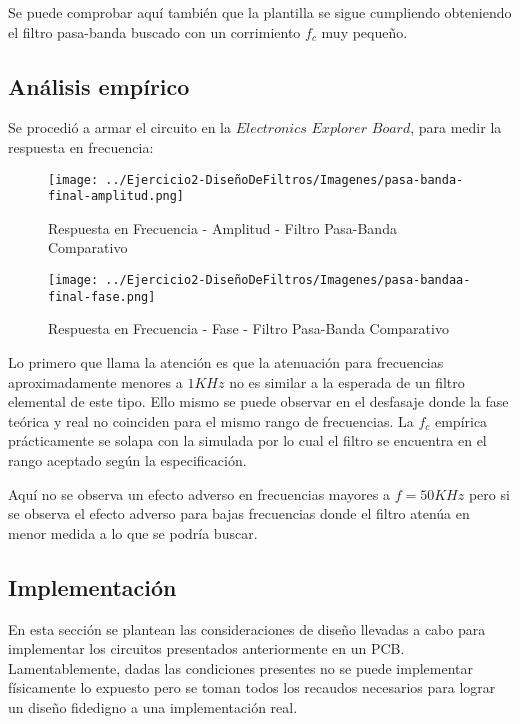 Se puede comprobar aquí también que la plantilla se sigue cumpliendo obteniendo el filtro pasa-banda buscado con un corrimiento
$f_c$ muy pequeño.

\subsection{Análisis empírico}

Se procedió a armar el circuito en la $Electronics$ $Explorer$ $Board$, para medir la respuesta en frecuencia:

\begin{figure}[H]
    \centering
    \texttt{[image: ../Ejercicio2-DiseñoDeFiltros/Imagenes/pasa-banda-final-amplitud.png]}
    \caption{Respuesta en Frecuencia - Amplitud - Filtro Pasa-Banda Comparativo}
\end{figure}

\begin{figure}[H]
    \centering
    \texttt{[image: ../Ejercicio2-DiseñoDeFiltros/Imagenes/pasa-bandaa-final-fase.png]}
    \caption{Respuesta en Frecuencia - Fase - Filtro Pasa-Banda Comparativo}
\end{figure}

Lo primero que llama la atención es que la atenuación para frecuencias aproximadamente menores a $1 KHz$ no es similar
a la esperada de un filtro elemental de este tipo. Ello mismo se puede observar en el desfasaje donde la fase teórica y real no coinciden para el mismo
rango de frecuencias. La $f_c$ empírica prácticamente se solapa con la simulada por lo cual el filtro se encuentra en el rango
aceptado según la especificación. 

Aquí no se observa un efecto adverso en frecuencias mayores a $f=50KHz$ pero si se observa el efecto adverso para bajas frecuencias donde el filtro
atenúa en menor medida a lo que se podría buscar.


\subsection{Implementación}


En esta sección se plantean las consideraciones de diseño llevadas a cabo para implementar los circuitos presentados anteriormente 
en un PCB. Lamentablemente, dadas las condiciones presentes no se puede implementar físicamente lo expuesto pero se toman todos los 
recaudos necesarios para lograr un diseño fidedigno a una implementación real. \par 

